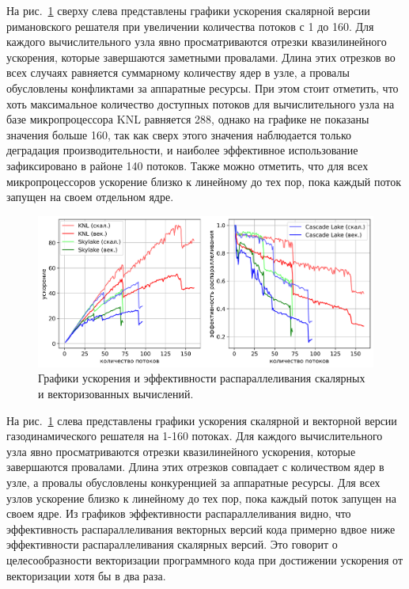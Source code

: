 На рис.~\ref{fig:text_3_omp2} сверху слева представлены графики ускорения скалярной версии римановского решателя при увеличении количества потоков с 1 до 160.
Для каждого вычислительного узла явно просматриваются отрезки квазилинейного ускорения, которые завершаются заметными провалами.
Длина этих отрезков во всех случаях равняется суммарному количеству ядер в узле, а провалы обусловлены конфликтами за аппаратные ресурсы.
При этом стоит отметить, что хоть максимальное количество доступных потоков для вычислительного узла на базе микропроцессора KNL равняется 288, однако на графике не показаны значения больше 160, так как сверх этого значения наблюдается только деградация производительности, и наиболее эффективное использование зафиксировано в районе 140 потоков.
Также можно отметить, что для всех микропроцессоров ускорение близко к линейному до тех пор, пока каждый поток запущен на своем отдельном ядре.

\begin{figure}[ht]
\centering
\includegraphics[width=1.0\textwidth]{./fig/par_openmp_scalar_vec_chart_big.png}
\singlespacing
\caption{Графики ускорения и эффективности распараллеливания скалярных и векторизованных вычислений.}
\label{fig:text_3_omp2}
\end{figure}

На рис.~\ref{fig:text_3_omp2} слева представлены графики ускорения скалярной и векторной версии газодинамического решателя на 1-160 потоках.
Для каждого вычислительного узла явно просматриваются отрезки квазилинейного ускорения, которые завершаются провалами.
Длина этих отрезков совпадает с количеством ядер в узле, а провалы обусловлены конкуренцией за аппаратные ресурсы.
Для всех узлов ускорение близко к линейному до тех пор, пока каждый поток запущен на своем ядре.
Из графиков эффективности распараллеливания видно, что эффективность распараллеливания векторных версий кода примерно вдвое ниже эффективности распараллеливания скалярных версий.
Это говорит о целесообразности векторизации программного кода при достижении ускорения от векторизации хотя бы в два раза.

